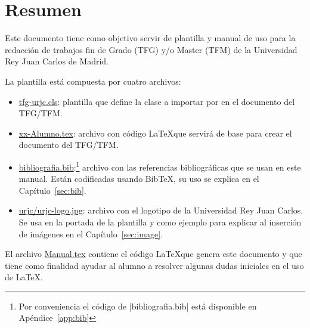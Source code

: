 \documentclass[twoside]{tfg-urjc}
\begin{document}
\maketitle


\cleardoublepage
{}
\setcounter{page}{1}

\chapter*{Resumen}


Este documento tiene como objetivo servir de plantilla y manual de uso
para la redacción de trabajos fin de Grado (TFG) y/o Master (TFM) de
la Universidad Rey Juan Carlos de Madrid.

La plantilla está compuesta por cuatro archivos:
\begin{itemize}
\item \url{tfg-urjc.cls}: plantilla que define la clase a importar por
  en el documento del TFG/TFM.
\item \url{xx-Alumno.tex}: archivo con código \LaTeX que servirá de
  base para crear el documento del TFG/TFM.
\item \url{bibliografia.bib}:\footnote{Por conveniencia el código de
    \code|bibliografia.bib| está disponible en Apéndice~\ref{app:bib}}
  archivo con las referencias bibliográficas que se usan en este
  manual. Están codificadas usando BibTeX, su uso se explica en el
  Capítulo~\ref{sec:bib}.
\item \url{urjc/urjc-logo.jpg}: archivo con el logotipo de la
  Universidad Rey Juan Carlos. Se usa en la portada de la plantilla y
  como ejemplo para explicar al inserción de imágenes en el
  Capítulo~\ref{sec:image}.
\end{itemize}

El archivo \url{Manual.tex} contiene el código \LaTeX que genera este
documento y que tiene como finalidad ayudar al alumno a resolver
algunas dudas iniciales en el uso de \LaTeX.






{
  \setlength{\parskip}{1pt}

  \cleardoublepage
  \tableofcontents

  \cleardoublepage
  \listoftables

  \cleardoublepage
  \listoffigures
}
\end{document}

